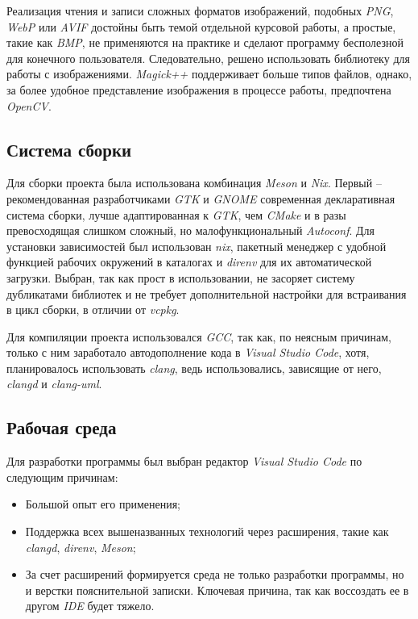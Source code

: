 \documentclass[variant=courcework]{bsuir}
\begin{document}
Реализация чтения и записи сложных форматов изображений, подобных \textit{PNG},
\textit{WebP} или \textit{AVIF} достойны быть темой отдельной курсовой работы, а
простые, такие как \textit{BMP}, не применяются на практике и сделают программу
бесполезной для конечного пользователя. Следовательно, решено использовать
библиотеку для работы с изображениями. \textit{Magick++} поддерживает больше
типов файлов, однако, за более удобное представление изображения в процессе
работы, предпочтена \textit{OpenCV}.

\subsection{Система сборки}
Для сборки проекта была использована комбинация \textit{Meson} и \textit{Nix}.
Первый -- рекомендованная разработчиками \textit{GTK} и \textit{GNOME}
современная декларативная система сборки, лучше адаптированная к \textit{GTK},
чем \textit{CMake} и в разы превосходящая слишком сложный, но малофункциональный
\textit{Autoconf}. Для установки зависимостей был использован \textit{nix},
пакетный менеджер с удобной функцией рабочих окружений в каталогах и
\textit{direnv} для их автоматической загрузки. Выбран, так как прост в
использовании, не засоряет систему дубликатами библиотек и не требует
дополнительной настройки для встраивания в цикл сборки, в отличии от
\textit{vcpkg}.

Для компиляции проекта использовался \textit{GCC}, так как, по неясным причинам,
только с ним заработало автодополнение кода в \textit{Visual Studio Code}, хотя,
планировалось использовать \textit{clang}, ведь использовались, зависящие от
него, \textit{clangd} и \textit{clang-uml}.

\subsection{Рабочая среда}
Для разработки программы был выбран редактор \textit{Visual Studio Code} по
следующим причинам:

\begin{itemize}
    \item Большой опыт его применения;
    \item Поддержка всех вышеназванных технологий через расширения, такие как
          \textit{clangd}, \textit{direnv}, \textit{Meson};
    \item За счет расширений формируется среда не только разработки программы,
          но и верстки пояснительной записки. Ключевая причина, так как
          воссоздать ее в другом \textit{IDE} будет тяжело.
\end{itemize}
\end{document}
